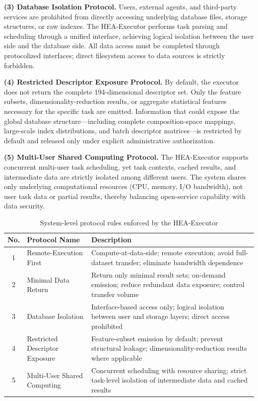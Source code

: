 \documentclass{article}
\begin{document}
\textbf{(3) Database Isolation Protocol.} Users, external agents, and third-party services are prohibited from directly accessing underlying database files, storage structures, or raw indexes. The HEA-Executor performs task parsing and scheduling through a unified interface, achieving logical isolation between the user side and the database side. All data access must be completed through protocolized interfaces; direct filesystem access to data sources is strictly forbidden.

\textbf{(4) Restricted Descriptor Exposure Protocol.} By default, the executor does not return the complete 194-dimensional descriptor set. Only the feature subsets, dimensionality-reduction results, or aggregate statistical features necessary for the specific task are emitted. Information that could expose the global database structure---including complete composition-space mappings, large-scale index distributions, and batch descriptor matrices---is restricted by default and released only under explicit administrative authorization.

\textbf{(5) Multi-User Shared Computing Protocol.} The HEA-Executor supports concurrent multi-user task scheduling, yet task contexts, cached results, and intermediate data are strictly isolated among different users. The system shares only underlying computational resources (CPU, memory, I/O bandwidth), not user task data or partial results, thereby balancing open-service capability with data security.

\begin{table}[htbp]
\centering
\caption{System-level protocol rules enforced by the HEA-Executor}
\label{tab:protocol_rules}
\begin{tabular}{@{}clp{7.2cm}@{}}
\toprule
No. & Protocol Name & Description \\
\midrule
1 & Remote-Execution First & Compute-at-data-side; remote execution; avoid full-dataset transfer; eliminate bandwidth dependence \\
2 & Minimal Data Return & Return only minimal result sets; on-demand emission; reduce redundant data exposure; control transfer volume \\
3 & Database Isolation & Interface-based access only; logical isolation between user and storage layers; direct access prohibited \\
4 & Restricted Descriptor Exposure & Feature-subset emission by default; prevent structural leakage; dimensionality-reduction results where applicable \\
5 & Multi-User Shared Computing & Concurrent scheduling with resource sharing; strict task-level isolation of intermediate data and cached results \\
\bottomrule
\end{tabular}
\end{table}
\end{document}
